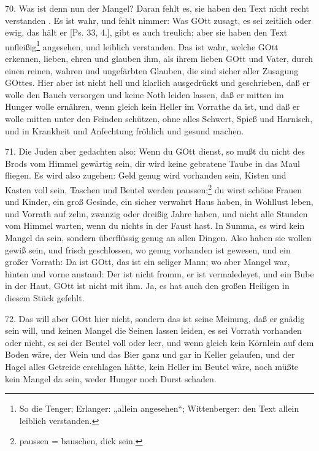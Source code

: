 70. Was ist denn nun der Mangel? Daran fehlt es, sie haben den Text nicht recht verstanden
. Es ist wahr, und fehlt nimmer: Was GOtt zusagt, es sei zeitlich oder ewig, das hält er [Ps. 33, 4.], gibt es auch treulich; aber sie haben den Text unfleißig\footnote{So die Tenger; Erlanger: „allein angesehen“; Wittenberger: den Text allein leiblich verstanden.} angesehen, und leiblich verstanden. Das ist wahr, welche GOtt erkennen, lieben, ehren und glauben ihm, als ihrem lieben GOtt und Vater, durch einen reinen, wahren und ungefärbten Glauben, die sind sicher aller Zusagung GOttes. Hier aber ist nicht hell und klarlich ausgedrückt und geschrieben, daß er wolle den Bauch versorgen und keine Noth leiden lassen, daß er mitten im Hunger wolle ernähren, wenn gleich kein Heller im Vorrathe da ist, und daß er wolle mitten unter den Feinden schützen, ohne alles Schwert, Spieß und Harnisch, und in Krankheit und Anfechtung fröhlich und gesund machen.

71. Die Juden aber gedachten also: Wenn du GOtt dienst, so mußt du nicht des Brods vom Himmel gewärtig sein, dir wird keine gebratene Taube in das Maul fliegen. Es wird also zugehen: Geld genug wird vorhanden sein, Kisten und Kasten voll sein, Taschen und Beutel werden paussen;\footnote{paussen = bauschen, dick sein.} du wirst schöne Frauen und Kinder, ein groß Gesinde, ein sicher verwahrt Haus haben, in Wohllust leben, und Vorrath auf zehn, zwanzig oder dreißig Jahre haben, und nicht alle Stunden vom Himmel warten, wenn du nichts in der Faust hast. In Summa, es wird kein Mangel da sein, sondern überflüssig genug an allen Dingen. Also haben sie wollen gewiß sein, und frisch geschlossen, wo genug vorhanden ist gewesen, und ein großer Vorrath: Da ist GOtt, das ist ein seliger Mann; wo aber Mangel war, hinten und vorne anstand: Der ist nicht fromm, er ist vermaledeyet, und ein Bube in der Haut, GOtt ist nicht mit ihm. Ja, es hat auch den großen Heiligen in diesem Stück gefehlt.

72. Das will aber GOtt hier nicht, sondern das ist seine Meinung, daß er gnädig sein will, und keinen Mangel die Seinen lassen leiden, es sei Vorrath vorhanden oder nicht, es sei der Beutel voll oder leer, und wenn gleich kein Körnlein auf dem Boden wäre, der Wein und das Bier ganz und gar in Keller gelaufen, und der Hagel alles Getreide erschlagen hätte, kein Heller im Beutel wäre, noch müßte kein Mangel da sein, weder Hunger noch Durst schaden.

